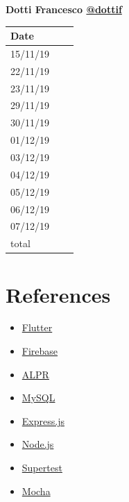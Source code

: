 \documentclass{article}
\begin{document}
	\begin{center}
		{\bf Dotti Francesco \href{https://github.com/dottif}{@dottif} }
		\vspace{2mm}

			\begin{tabular}{p{1.3cm}|p{1.8cm}|p{6.7cm}}
				\hline
				\bf Date & \bf \makebox[1.8cm][c]{Hours} & \bf \makebox[6.7cm][c]{Description} \\
				\hline
				15/11/19 & \makebox[1.8cm][c]{1} & \makebox[6.7cm][c]{Initial Structure}\\
				22/11/19 & \makebox[1.8cm][c]{1.5} & \makebox[6.7cm][c]{Introduction}\\
				23/11/19 & \makebox[1.8cm][c]{1.5} & \makebox[6.7cm][c]{Architectural design}\\
				29/11/19 & \makebox[1.8cm][c]{0.5} & \makebox[6.7cm][c]{Component view}\\
				30/11/19 & \makebox[1.8cm][c]{6.5}\makebox[6.7cm][c]{Component Deployment Runtime view}\\
				01/12/19 & \makebox[1.8cm][c]{8} & \makebox[6.7cm][c]{Architectural design}\\
				03/12/19 & \makebox[1.8cm][c]{0.5} & \makebox[6.7cm][c]{Architectural design}\\
				04/12/19 & \makebox[1.8cm][c]{2.5} & \makebox[6.7cm][c]{Architectural design}\\
				05/12/19 & \makebox[1.8cm][c]{4} & \makebox[6.7cm][c]{Req. traceability and Implementation}\\
				06/12/19 & \makebox[1.8cm][c]{3} & \makebox[6.7cm][c]{Implementation and Testing}\\
				07/12/19 & \makebox[1.8cm][c]{8} & \makebox[6.7cm][c]{IT,UI, General improvements}\\
				\hline
				total    & \makebox[1.8cm][c]{37}
			\end{tabular}
	\end{center}
\newpage
\section{References}
\begin{itemize}
	\item \href{https://flutter.dev/}{Flutter}
	\item \href{https://firebase.google.com/}{Firebase}
	\item \href{https://www.openalpr.com/}{ALPR}
	\item \href{https://www.mysql.com/}{MySQL}
	\item \href{https://expressjs.com/}{Express.js}
	\item \href{https://nodejs.org/en/}{Node.js}
	\item \href{https://www.npmjs.com/package/supertest}{Supertest}
	\item \href{https://mochajs.org/}{Mocha}
\end{itemize}
\end{document}
